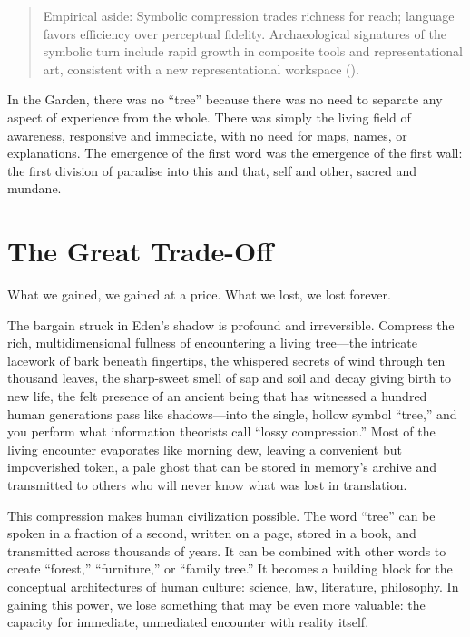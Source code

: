 \begin{quote}\small
Empirical aside: Symbolic compression trades richness for reach; language favors efficiency over perceptual fidelity. Archaeological signatures of the symbolic turn include rapid growth in composite tools and representational art, consistent with a new representational workspace (\parencite{dunbar1996grooming}).
\end{quote}

In the Garden, there was no “tree” because there was no need to separate any aspect of experience from the whole. There was simply the living field of awareness, responsive and immediate, with no need for maps, names, or explanations. The emergence of the first word was the emergence of the first wall: the first division of paradise into this and that, self and other, sacred and mundane.

\section{The Great Trade-Off}

What we gained, we gained at a price. What we lost, we lost forever.

The bargain struck in Eden's shadow is profound and irreversible. Compress the rich, multidimensional fullness of encountering a living tree—the intricate lacework of bark beneath fingertips, the whispered secrets of wind through ten thousand leaves, the sharp-sweet smell of sap and soil and decay giving birth to new life, the felt presence of an ancient being that has witnessed a hundred human generations pass like shadows—into the single, hollow symbol “tree,” and you perform what information theorists call “lossy compression.” Most of the living encounter evaporates like morning dew, leaving a convenient but impoverished token, a pale ghost that can be stored in memory's archive and transmitted to others who will never know what was lost in translation.

This compression makes human civilization possible. The word “tree” can be spoken in a fraction of a second, written on a page, stored in a book, and transmitted across thousands of years. It can be combined with other words to create “forest,” “furniture,” or “family tree.” It becomes a building block for the conceptual architectures of human culture: science, law, literature, philosophy. In gaining this power, we lose something that may be even more valuable: the capacity for immediate, unmediated encounter with reality itself.

